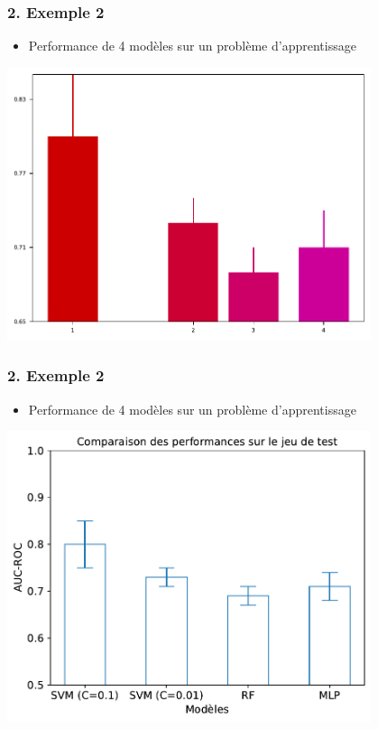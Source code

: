 \documentclass[sans,14pt]{beamer}
\begin{document}
{\begin{frame}
  \frametitle{2. Exemple 2}
  \begin{itemize}
  \item[] Performance de 4 modèles sur un problème d'apprentissage
  \end{itemize}
  \begin{center}
    \includegraphics[width=0.8\textwidth]{figures/horrible_bar_plot}
  \end{center}
\end{frame}

\begin{frame}
  \frametitle{2. Exemple 2}
  \begin{itemize}
  \item[] Performance de 4 modèles sur un problème d'apprentissage
  \end{itemize}
  \begin{center}
    \includegraphics[width=0.8\textwidth]{figures/meilleur_bar_plot}
  \end{center}
\end{frame}

}
\end{document}
